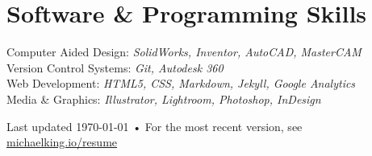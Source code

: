 \documentclass[11pt, letterpaper]{article}
\newcommand{\years}[1]{\marginnote{\footnotesize #1}} %
\begin{document}


  \section*{Software \& Programming Skills}
  Computer Aided Design: \emph{SolidWorks, Inventor, AutoCAD, MasterCAM}\\
  Version Control Systems: \emph{Git, Autodesk 360}\\
  Web Development: \emph{HTML5, CSS, Markdown, Jekyll, Google Analytics}\\
  Media \& Graphics: \emph{Illustrator, Lightroom, Photoshop, InDesign}



\begin{center}
{\hspace{-.5in} \scriptsize Last updated \today\- •\- For the most recent version, see \href{http://www.michaelelliotking.com/resume}{michaelking.io/resume}}
\end{center}
\end{document}
